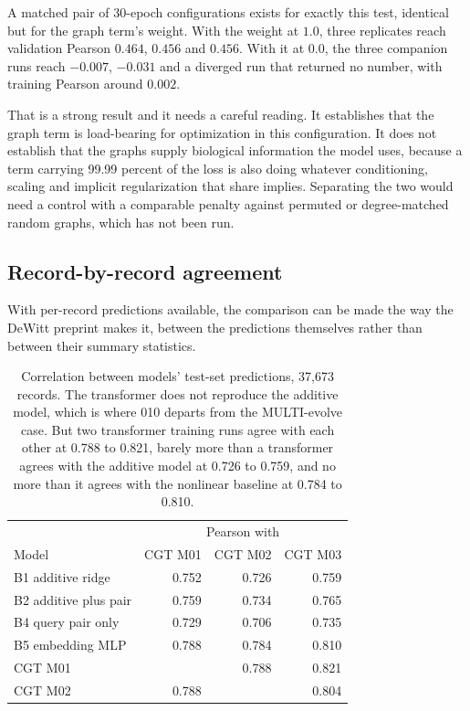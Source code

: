 A matched pair of 30-epoch configurations exists for exactly this test, identical
but for the graph term's weight. With the weight at $1.0$, three replicates reach
validation Pearson $0.464$, $0.456$ and $0.456$. With it at $0.0$, the three
companion runs reach $-0.007$, $-0.031$ and a diverged run that returned no
number, with training Pearson around $0.002$.

That is a strong result and it needs a careful reading. It establishes that the
graph term is load-bearing for optimization in this configuration. It does not
establish that the graphs supply biological information the model uses, because a
term carrying 99.99 percent of the loss is also doing whatever conditioning,
scaling and implicit regularization that share implies. Separating the two would
need a control with a comparable penalty against permuted or degree-matched
random graphs, which has not been run.

\subsection{Record-by-record agreement}
\label{sec:paired}

With per-record predictions available, the comparison can be made the way the
DeWitt preprint makes it, between the predictions themselves rather than between
their summary statistics.

\begin{table}[htbp]
\centering
\begin{tabular}{lrrr}
\hline
& \multicolumn{3}{c}{Pearson with} \\
Model & CGT M01 & CGT M02 & CGT M03 \\
\hline
B1 additive ridge & 0.752 & 0.726 & 0.759 \\
B2 additive plus pair & 0.759 & 0.734 & 0.765 \\
B4 query pair only & 0.729 & 0.706 & 0.735 \\
B5 embedding MLP & 0.788 & 0.784 & 0.810 \\
CGT M01 & & 0.788 & 0.821 \\
CGT M02 & 0.788 & & 0.804 \\
\hline
\end{tabular}
\caption{Correlation between models' test-set predictions, 37{,}673 records.
The transformer does not reproduce the additive model, which is where 010
departs from the MULTI-evolve case. But two transformer training runs agree with
each other at 0.788 to 0.821, barely more than a transformer agrees with the
additive model at 0.726 to 0.759, and no more than it agrees with the nonlinear
baseline at 0.784 to 0.810.}
\label{tab:paired}
\end{table}

